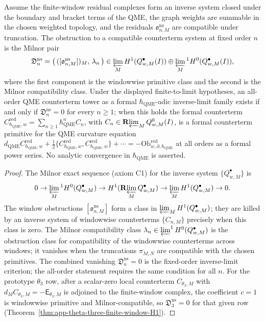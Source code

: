 \begin{thm}
\label{thm:completion-milnor-obstruction-vector}
Assume the finite-window residual complexes form an inverse system
closed under the boundary and bracket terms of the QME, the graph
weights are summable in the chosen weighted topology, and the residuals
\(\mathfrak o^{\mathrm{ns}}_{n,M}\) are compatible under truncation.
The obstruction to a compatible counterterm system at fixed order \(n\)
is the Milnor pair
\[
  \mathfrak D^{\mathrm{ns}}_n
  =\bigl(\,([\mathfrak o^{\mathrm{ns}}_{n,M}])_M,\,\lambda_n\,\bigr)
  \in\varprojlim_M H^1(Q^\bullet_{w,M}(I))
   \oplus\varprojlim_M{}^1H^0(Q^\bullet_{w,M}(I)),
\]
where the first component is the windowwise primitive class and
the second is the Milnor compatibility class.  Under the displayed
finite-to-limit hypotheses, an all-order QME counterterm tower as a
formal \(\hbar_{\mathrm{QME}}\)-adic inverse-limit family exists if and only if
\(\mathfrak D^{\mathrm{ns}}_n=0\) for every \(n\ge 1\); when this
holds the formal counterterm \(C^{\mathrm{red}}_{\hbar_{\mathrm{QME}},w}=
\sum_{n\ge 1}\hbar_{\mathrm{QME}}^n C_{n}\), with
\(C_n\in\mathbf R\!\varprojlim_M Q^0_{w,M}(I)\), is a formal
counterterm primitive for the QME curvature equation
\(d_{\mathrm{QME}}C^{\mathrm{red}}_{\hbar_{\mathrm{QME}},w}+
\tfrac12\{C^{\mathrm{red}}_{\hbar_{\mathrm{QME}},w},
C^{\mathrm{red}}_{\hbar_{\mathrm{QME}},w}\}+\cdots
=-\mathrm{Ob}^{\mathrm{red}}_{w,\partial,\hbar_{\mathrm{QME}}}\) at all orders as a
formal power series.  No analytic convergence in \(\hbar_{\mathrm{QME}}\) is asserted.
\end{thm}

\begin{proof}
The Milnor exact sequence (axiom C1) for the inverse system
\(\{Q^\bullet_{w,M}\}\) is
\[
  0\to\varprojlim_M{}^1 H^0(Q^\bullet_{w,M})
   \to H^1(\mathbf R\!\varprojlim_M Q^\bullet_{w,M})
   \to\varprojlim_M H^1(Q^\bullet_{w,M})
   \to 0.
\]
The window obstructions \([\mathfrak o^{\mathrm{ns}}_{n,M}]\)
form a class in
\(\varprojlim_M H^1(Q^\bullet_{w,M})\); they are killed by an
inverse system of windowwise counterterms
\(\{C_{n,M}\}\) precisely when this class is zero.  The Milnor
compatibility class \(\lambda_n\in
\varprojlim^1 H^0(Q^\bullet_{w,M})\) is the obstruction class for
compatibility of the windowwise counterterms across windows; it
vanishes when the truncations \(\pi_{M,N}\) are compatible with
the chosen primitives.  The combined vanishing
\(\mathfrak D^{\mathrm{ns}}_n=0\) is the fixed-order inverse-limit
criterion; the all-order statement requires the same condition for all
\(n\).
For the prototype \(\theta_3\) row, after a scalar-zero local
counterterm \(C_{\theta_3,M}\) with
\(d_M C_{\theta_3,M}=-\mathsf E_{\theta_3,M}\) is adjoined to the
finite-window complex, the coefficient \(c=1\) is windowwise primitive
and Milnor-compatible, so
\(\mathfrak D^{\mathrm{ns}}_3=0\) for that given row
(Theorem~\ref{thm:app-theta-three-finite-window-H1}).
\end{proof}

